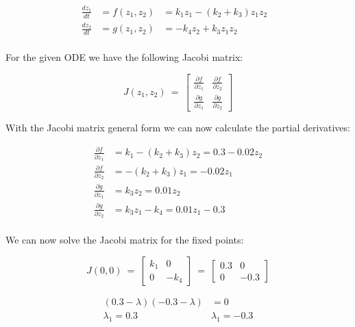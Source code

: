 \documentclass[]{scrartcl}
\begin{document}
\begin{center}
\noindent \begin{minipage}{.5\linewidth}
\begin{align*}
	\frac{dz_1}{dt} &= f(z_1,z_2) &= k_1 z_1 - (k_2 + k_3) z_1 z_2 \\
	\frac{dz_2}{dt} &= g(z_1,z_2) &= - k_4 z_2 + k_3 z_1 z_2 & \\
\end{align*}
\end{minipage}
\end{center}


For the given ODE we have the following Jacobi matrix:

\[
J(z_1,z_2) ~=~
\begin{bmatrix}
  \frac{\partial f}{\partial z_1} & \frac{\partial f}{\partial z_2} \\[1ex] %
  \frac{\partial g}{\partial z_1} & \frac{\partial g}{\partial z_2}
\end{bmatrix}
\]

With the Jacobi matrix general form we can now calculate the partial derivatives:

\begin{center}
\begin{align*}
	\frac{\partial f}{\partial z_1} &= k_1 - (k_2 + k_3) z_2 = 0.3 - 0.02 z_2 \\
	\frac{\partial f}{\partial z_2} &= - (k_2 + k_3) z_1 = -0.02 z_1 \\
	\frac{\partial g}{\partial z_1} &= k_3 z_2 = 0.01 z_2 \\
	\frac{\partial g}{\partial z_2} &= k_3 z_1 - k_4 = 0.01 z_1 - 0.3 \\
\end{align*}
\end{center}

We can now solve the Jacobi matrix for the fixed points:

\[
J(0,0) ~=~
\begin{bmatrix}
  k_1 & 0 \\[1ex] %
  0 & -k_4
\end{bmatrix} ~=~
\begin{bmatrix}
  0.3 & 0 \\[1ex] %
  0 & -0.3
\end{bmatrix}
\]

\begin{center}
\begin{align*}
	(0.3 -\lambda)(-0.3 -\lambda) &= 0 \\
	\lambda_1 = 0.3 & \lambda_1 = -0.3 \\
\end{align*}
\end{center}
\end{document}
